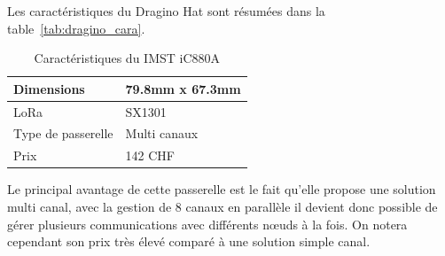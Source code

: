 Les caractéristiques du Dragino Hat sont résumées dans la table~\ref{tab:dragino_cara}.

\begin{table}[htb]
\caption[IMST iC880A Caractéristiques]{Caractéristiques du IMST iC880A}
\label{tab:imst_cara}
\centering
\begin{tabular}{ l | l }
\toprule
Dimensions & 79.8mm x 67.3mm \\
\midrule
LoRa & SX1301 \\
\midrule
Type de passerelle & Multi canaux \\
\midrule
Prix & 142 CHF \\
\bottomrule
\end{tabular}
\end{table}

Le principal avantage de cette passerelle est le fait qu’elle propose une solution multi canal, avec la gestion de 8 canaux en parallèle il devient donc possible de gérer plusieurs communications avec différents nœuds à la fois. On notera cependant son prix très élevé comparé à une solution simple canal.

